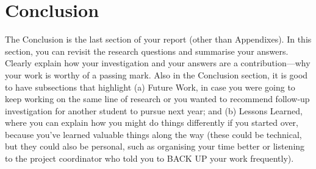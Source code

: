 \section{Conclusion}

The Conclusion is the last section of your report (other than Appendixes). In this section, you can revisit the research questions and summarise your answers. Clearly explain how your investigation and your answers are a contribution---why your work is worthy of a passing mark. Also in the Conclusion section, it is good to have subsections that highlight (a) Future Work, in case you were going to keep working on the same line of research or you wanted to recommend follow-up investigation for another student to pursue next year; and (b) Lessons Learned, where you can explain how you might do things differently if you started over, because you've learned valuable things along the way (these could be technical, but they could also be personal, such as organising your time better or listening to the project coordinator who told you to BACK UP your work frequently).
